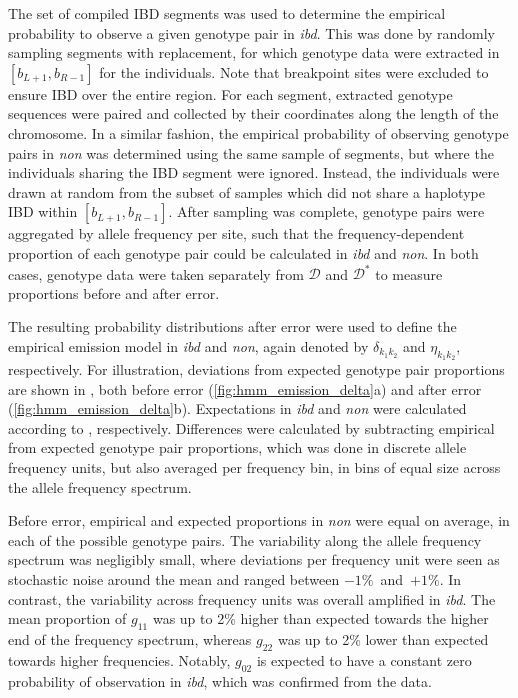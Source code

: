 The set of compiled IBD segments was used to determine the empirical probability to observe a given genotype pair in \emph{ibd}.
This was done by randomly sampling  segments with replacement, for which genotype data were extracted in ${[b_{L+1}, b_{R-1}]}$ for the  individuals.
Note that breakpoint sites were excluded to ensure IBD over the entire region.
For each segment, extracted genotype sequences were paired and collected by their coordinates along the length of the chromosome.
In a similar fashion, the empirical probability of observing genotype pairs in \emph{non} was determined using the same sample of segments, but where the  individuals sharing the IBD segment were ignored.
Instead, the  individuals were drawn at random from the subset of samples which did not share a haplotype IBD within ${[b_{L+1}, b_{R-1}]}$.
After sampling was complete, genotype pairs were aggregated by allele frequency per site, such that the frequency-dependent proportion of each genotype pair could be calculated in \emph{ibd} and \emph{non}.
In both cases, genotype data were taken separately from $\mathcal{D}$ and $\mathcal{D}^\ast$ to measure proportions before and after error.

%

%

The resulting probability distributions after error were used to define the empirical emission model in \emph{ibd} and \emph{non}, again denoted by $\delta_{k_1 k_2}$ and $\eta_{k_1 k_2}$, respectively.
For illustration, deviations from expected genotype pair proportions are shown in , both before error (\ref{fig:hmm_emission_delta}{a}) and after error (\ref{fig:hmm_emission_delta}{b}).
Expectations in \emph{ibd} and \emph{non} were calculated according to , respectively.
Differences were calculated by subtracting empirical from expected genotype pair proportions, which was done in discrete allele frequency units, but also averaged per frequency bin, in  bins of equal size across the allele frequency spectrum.

Before error, empirical and expected proportions in \emph{non} were equal on average, in each of the  possible genotype pairs.
The variability along the allele frequency spectrum was negligibly small, where deviations per frequency unit were seen as stochastic noise around the mean and ranged between $-1\%$~and~$+1\%$.
In contrast, the variability across frequency units was overall amplified in \emph{ibd}.
The mean proportion of $g_{11}$ was up to 2\% higher than expected towards the higher end of the frequency spectrum, whereas $g_{22}$ was up to 2\% lower than expected towards higher frequencies.
Notably, $g_{02}$ is expected to have a constant zero probability of observation in \emph{ibd}, which was confirmed from the data.

